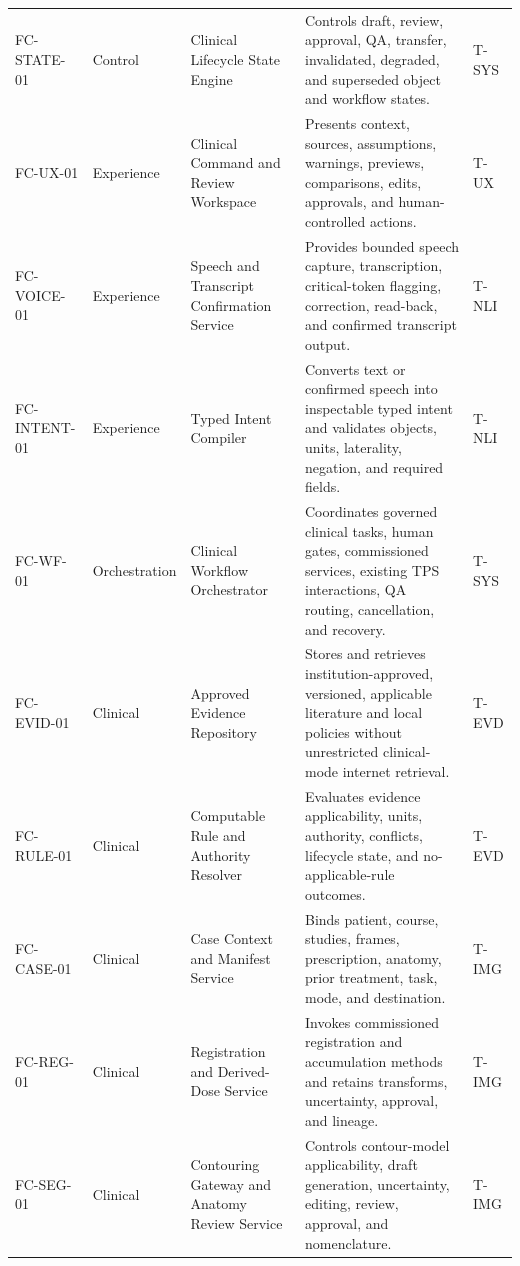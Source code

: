 \documentclass[11pt,letterpaper]{article}
\begin{document}
\begin{scriptsize}
\begin{longtable}{@{}L{0.15\textwidth}L{0.11\textwidth}L{0.21\textwidth}L{0.38\textwidth}L{0.08\textwidth}@{}}
\addlinespace[2pt]
\mbox{FC-STATE-01} & Control & Clinical Lifecycle State Engine & Controls draft, review, approval, QA, transfer, invalidated, degraded, and superseded object and workflow states. & T-SYS \\
\addlinespace[2pt]
\mbox{FC-UX-01} & Experience & Clinical Command and Review Workspace & Presents context, sources, assumptions, warnings, previews, comparisons, edits, approvals, and human-controlled actions. & T-UX \\
\addlinespace[2pt]
\mbox{FC-VOICE-01} & Experience & Speech and Transcript Confirmation Service & Provides bounded speech capture, transcription, critical-token flagging, correction, read-back, and confirmed transcript output. & T-NLI \\
\addlinespace[2pt]
\mbox{FC-INTENT-01} & Experience & Typed Intent Compiler & Converts text or confirmed speech into inspectable typed intent and validates objects, units, laterality, negation, and required fields. & T-NLI \\
\addlinespace[2pt]
\mbox{FC-WF-01} & Orchestration & Clinical Workflow Orchestrator & Coordinates governed clinical tasks, human gates, commissioned services, existing TPS interactions, QA routing, cancellation, and recovery. & T-SYS \\
\addlinespace[2pt]
\mbox{FC-EVID-01} & Clinical & Approved Evidence Repository & Stores and retrieves institution-approved, versioned, applicable literature and local policies without unrestricted clinical-mode internet retrieval. & T-EVD \\
\addlinespace[2pt]
\mbox{FC-RULE-01} & Clinical & Computable Rule and Authority Resolver & Evaluates evidence applicability, units, authority, conflicts, lifecycle state, and no-applicable-rule outcomes. & T-EVD \\
\addlinespace[2pt]
\mbox{FC-CASE-01} & Clinical & Case Context and Manifest Service & Binds patient, course, studies, frames, prescription, anatomy, prior treatment, task, mode, and destination. & T-IMG \\
\addlinespace[2pt]
\mbox{FC-REG-01} & Clinical & Registration and Derived-Dose Service & Invokes commissioned registration and accumulation methods and retains transforms, uncertainty, approval, and lineage. & T-IMG \\
\addlinespace[2pt]
\mbox{FC-SEG-01} & Clinical & Contouring Gateway and Anatomy Review Service & Controls contour-model applicability, draft generation, uncertainty, editing, review, approval, and nomenclature. & T-IMG \\

\end{longtable}
\end{scriptsize}
\end{document}
